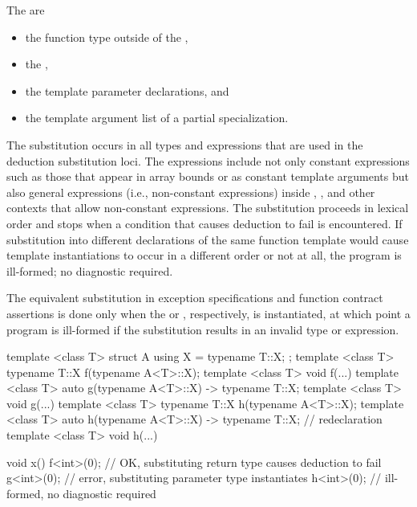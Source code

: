 \pnum
{}%
The  are
\begin{itemize}
\item the function type outside of the ,
\item the ,
\item the template parameter declarations, and
\item the template argument list of a partial specialization.
\end{itemize}
The substitution occurs in all types and expressions that are used
in the deduction substitution loci.
The expressions include not only
constant expressions such as those that appear in array bounds or as constant
template arguments but also general expressions (i.e., non-constant expressions)
inside , , and other contexts that allow non-constant
expressions. The substitution proceeds in lexical order and stops when
a condition that causes deduction to fail is encountered.
If substitution into different declarations of the same function template would
cause template instantiations to occur in a different order or not at all,
the program is ill-formed; no diagnostic required.
\begin{note}
The equivalent substitution in
exception specifications
and function contract assertions
is done only when
the 
or , respectively,
is instantiated,
at which point a program is ill-formed
if the substitution results in an invalid type or expression.
\end{note}
\begin{example}
\begin{codeblock}
template <class T> struct A { using X = typename T::X; };
template <class T> typename T::X f(typename A<T>::X);
template <class T> void f(...) { }
template <class T> auto g(typename A<T>::X) -> typename T::X;
template <class T> void g(...) { }
template <class T> typename T::X h(typename A<T>::X);
template <class T> auto h(typename A<T>::X) -> typename T::X;   // redeclaration
template <class T> void h(...) { }

void x() {
  f<int>(0);        // OK, substituting return type causes deduction to fail
  g<int>(0);        // error, substituting parameter type instantiates 
  h<int>(0);        // ill-formed, no diagnostic required
}
\end{codeblock}
\end{example}

